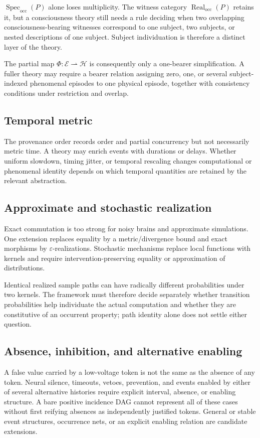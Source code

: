 \documentclass[11pt,a4paper]{article}
\theoremstyle{clean}
\theoremstyle{definition}
\newcommand{\Spec}{\operatorname{Spec}}
\newcommand{\Real}{\operatorname{Real}}
\newcommand{\Occ}{\mathrm{occ}}
\begin{document}
$\Spec_\Occ(P)$ alone loses multiplicity. The witness category $\Real_\Occ(P)$ retains it, but a consciousness theory still needs a rule deciding when two overlapping consciousness-bearing witnesses correspond to one subject, two subjects, or nested descriptions of one subject. Subject individuation is therefore a distinct layer of the theory.

The partial map $\Phi:\mathcal E\rightharpoonup\mathcal H$ is consequently only a one-bearer simplification. A fuller theory may require a bearer relation assigning zero, one, or several subject-indexed phenomenal episodes to one physical episode, together with consistency conditions under restriction and overlap.

\subsection{Temporal metric}

The provenance order records order and partial concurrency but not necessarily metric time. A theory may enrich events with durations or delays. Whether uniform slowdown, timing jitter, or temporal rescaling changes computational or phenomenal identity depends on which temporal quantities are retained by the relevant abstraction.

\subsection{Approximate and stochastic realization}

Exact commutation is too strong for noisy brains and approximate simulations. One extension replaces equality by a metric/divergence bound and exact morphisms by $\varepsilon$-realizations. Stochastic mechanisms replace local functions with kernels and require intervention-preserving equality or approximation of distributions.

Identical realized sample paths can have radically different probabilities under two kernels. The framework must therefore decide separately whether transition probabilities help individuate the actual computation and whether they are constitutive of an occurrent property; path identity alone does not settle either question.

\subsection{Absence, inhibition, and alternative enabling}

A false value carried by a low-voltage token is not the same as the absence of any token. Neural silence, timeouts, vetoes, prevention, and events enabled by either of several alternative histories require explicit interval, absence, or enabling structure. A bare positive incidence DAG cannot represent all of these cases without first reifying absences as independently justified tokens. General or stable event structures, occurrence nets, or an explicit enabling relation are candidate extensions.
\end{document}
